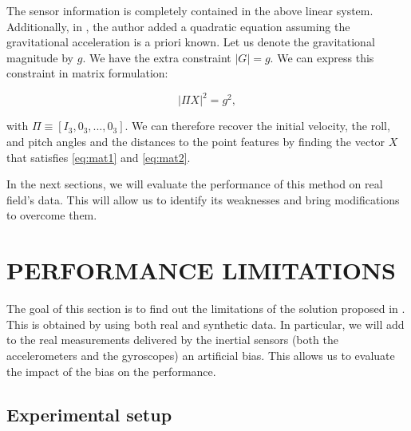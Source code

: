 \documentclass[letterpaper, 10 pt, conference]{ieeeconf}  %
\begin{document}
The sensor information is completely contained in the above linear system. Additionally, in \cite{Martinelli2014}, the author added a quadratic equation assuming the gravitational acceleration is a priori known.
Let us denote the gravitational magnitude by $g$.
We have the extra constraint $|G| = g$. We can express this constraint in matrix formulation:

\begin{equation}
\label{eq:mat2} \tag{10}
| \Pi X | ^2 = g^2,
\end{equation}

\noindent with $\Pi \equiv [I_3, 0_3, ..., 0_3]$. We can therefore recover the initial velocity, the roll, and pitch angles and the distances to the point features
by finding the vector $X$ that satisfies \ref{eq:mat1} and \ref{eq:mat2}.

In the next sections, we will evaluate the performance of this method on real field's data.
This will allow us to identify its weaknesses and bring modifications to overcome them.





\section{PERFORMANCE LIMITATIONS}\label{SectionBottlenecks}

The goal of this section is to find out the limitations of the solution proposed in \cite{Martinelli2014}. This is obtained by using both real and synthetic data. In particular, we will add to the real measurements delivered by the inertial sensors (both the accelerometers and the gyroscopes) an artificial bias. This allows us to evaluate the impact of the bias on the performance.

\subsection{Experimental setup}
\end{document}
